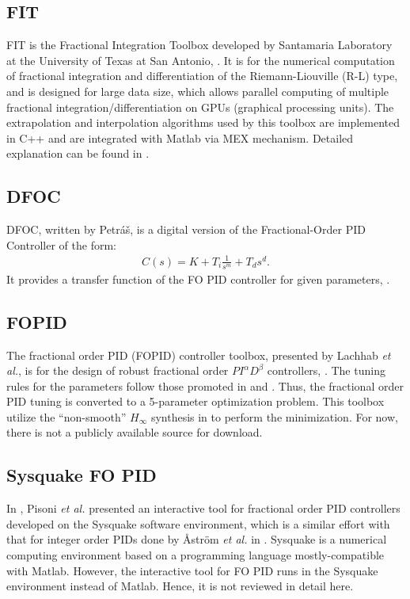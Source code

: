 \documentclass[11pt]{tCON2e}
\theoremstyle{plain}\newtheorem{theorem}{Theorem}
\theoremstyle{definition}
\theoremstyle{remark}
\begin{document}
\subsection{FIT}
FIT is the Fractional Integration Toolbox developed by Santamaria Laboratory at the University of Texas at San Antonio, \cite{ref:FIT_download}. It is for the numerical computation of fractional integration and differentiation of the Riemann-Liouville (R-L) type, and is designed for large data size, which allows parallel computing of multiple fractional integration/differentiation on GPUs (graphical processing units). The extrapolation and interpolation algorithms used by this toolbox are implemented in C++ and are integrated with Matlab via MEX mechanism. Detailed explanation can be found in \cite{ref:FIT}.



\subsection{DFOC}
DFOC, written by Petr\'{a}\v{s}, is a digital version of the Fractional-Order PID Controller of the form:
\begin{eqnarray}
C(s) = K + T_i\frac{1}{s^m} + T_d s^d.
\end{eqnarray}
It provides a transfer function of the FO PID controller for given parameters, \cite{ref:Petras_DFOC}.




\subsection{FOPID}
The fractional order PID (FOPID) controller toolbox, presented by Lachhab \emph{et al.}, is for the design of robust fractional order $PI^\alpha D^\beta$ controllers, \cite{ref:Nabil_FOPID}. The tuning rules for the parameters follow those promoted in \cite{ref:Luoying1} and \cite{ref:Luoying}. Thus, the fractional order PID tuning is converted to a 5-parameter optimization problem. This toolbox utilize the ``non-smooth'' $H_{\infty}$ synthesis in \cite{ref:NonsmoothHinfinity} to perform the minimization. For now, there is not a publicly available source for download.




\subsection{Sysquake FO PID}
In \cite{ref:Sysquake}, Pisoni \emph{et al.} presented an interactive tool for fractional order PID controllers developed on the Sysquake software environment, which is a similar effort with that for integer order PIDs done by {\AA}str\"{o}m \emph{et al.} in \cite{ref:Sysquake_Astrom}. Sysquake is a numerical computing environment based on a programming language mostly-compatible with Matlab. However, the interactive tool for FO PID runs in the Sysquake environment instead of Matlab. Hence, it is not reviewed in detail here.
\end{document}
